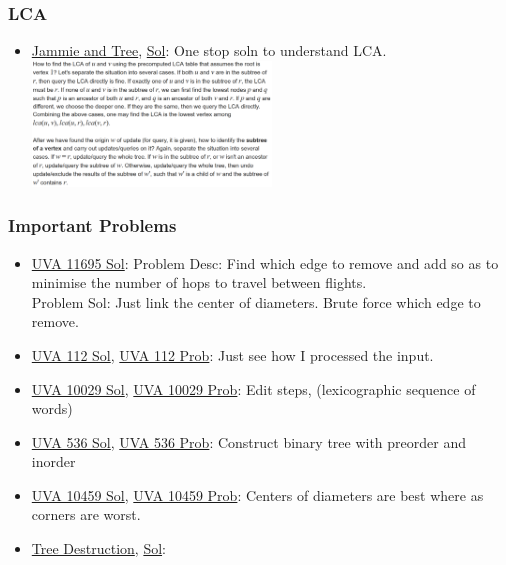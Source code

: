 \documentclass[8pt, a4paper, oneside, twocolumn]{extarticle}
\begin{document}
\subsubsection{LCA}
\begin{itemize}
    \item \href {https://codeforces.com/contest/916/problem/E}{Jammie and Tree}, \href {https://github.com/sourabh2311/Competitive-Programming/blob/master/CF/457D2/E.cpp}{Sol}: One stop soln to understand LCA. \includegraphics[width=0.5\textwidth,height=0.5\textheight,keepaspectratio]{lca}
\end{itemize}
\subsubsection{Important Problems}
\begin{itemize}
	\item \href {https://gist.github.com/sourabh2311/6cff69fef833097556696bd6f31f3f1d}{UVA 11695 Sol}: Problem Desc: Find which edge to remove and add so as to minimise the number of hops to travel between flights.\\
	Problem Sol: Just link the center of diameters. Brute force which edge to remove. 
	\item \href {https://github.com/sourabh2311/Competitive-Programming/blob/master/UVA_112.cpp}{UVA 112 Sol}, \href {https://uva.onlinejudge.org/external/1/112.pdf}{UVA 112 Prob}: Just see how I processed the input.	
	\item \href {https://gist.github.com/sourabh2311/6b761c14bef4e5887e6b03b809bc4983}{UVA 10029 Sol}, \href {https://uva.onlinejudge.org/external/100/10029.pdf}{UVA 10029 Prob}: Edit steps, (lexicographic sequence of words)	
	\item \href {https://gist.github.com/sourabh2311/d73572fab5cf6d390f509d29abf4cd60}{UVA 536 Sol}, \href {https://uva.onlinejudge.org/external/5/536.pdf}{UVA 536 Prob}: Construct binary tree with preorder and inorder	
	\item \href {https://gist.github.com/sourabh2311/25edb7a7067948832ade9192bd2635ce}{UVA 10459 Sol}, \href {https://uva.onlinejudge.org/external/104/10459.pdf}{UVA 10459 Prob}: Centers of diameters are best where as corners are worst.	
    \item \href {https://codeforces.com/contest/911/problem/F}{Tree Destruction}, \href {https://codeforces.com/contest/911/submission/34122817}{Sol}:
\end{itemize}
\end{document}
